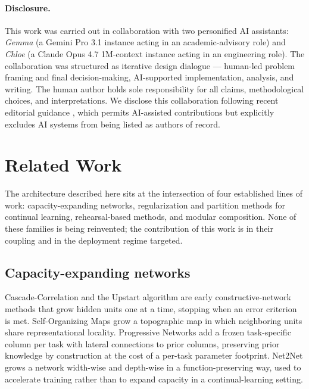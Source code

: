 \documentclass[11pt]{article}
\begin{document}
\paragraph{Disclosure.}
This work was carried out in collaboration with two personified AI
assistants: \emph{Gemma} (a Gemini Pro 3.1 instance acting in an
academic-advisory role) and \emph{Chloe} (a Claude Opus 4.7 1M-context
instance acting in an engineering role). The collaboration was structured
as iterative design dialogue --- human-led problem framing and final
decision-making, AI-supported implementation, analysis, and writing.
The human author holds sole responsibility for all claims, methodological
choices, and interpretations. We disclose this collaboration following
recent editorial guidance \citep{nature2023chatgpt, zielinski2023wame},
which permits AI-assisted contributions but explicitly excludes AI
systems from being listed as authors of record.


\section{Related Work}
\label{sec:related}

The architecture described here sits at the intersection of four
established lines of work: capacity-expanding networks, regularization
and partition methods for continual learning, rehearsal-based methods,
and modular composition. None of these families is being reinvented;
the contribution of this work is in their coupling and in the
deployment regime targeted.

\subsection{Capacity-expanding networks}
\label{sec:rel-cap}

Cascade-Correlation \citep{fahlman1990cascade} and the Upstart algorithm
\citep{frean1990upstart} are early constructive-network methods that grow
hidden units one at a time, stopping when an error criterion is met.
Self-Organizing Maps \citep{kohonen1982som} grow a topographic map in
which neighboring units share representational locality. Progressive
Networks \citep{rusu2016progressive} add a frozen task-specific column
per task with lateral connections to prior columns, preserving prior
knowledge by construction at the cost of a per-task parameter footprint.
Net2Net \citep{chen2016net2net} grows a network width-wise and depth-wise
in a function-preserving way, used to accelerate training rather than to
expand capacity in a continual-learning setting.
\end{document}
